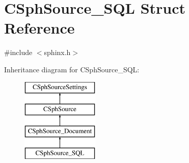 \hypertarget{structCSphSource__SQL}{\section{C\-Sph\-Source\-\_\-\-S\-Q\-L Struct Reference}
\label{structCSphSource__SQL}
}


{\ttfamily \#include $<$sphinx.\-h$>$}

Inheritance diagram for C\-Sph\-Source\-\_\-\-S\-Q\-L\-:\begin{figure}[H]
\begin{center}
\leavevmode
\includegraphics[height=4.000000cm]{structCSphSource__SQL}
\end{center}
\end{figure}
